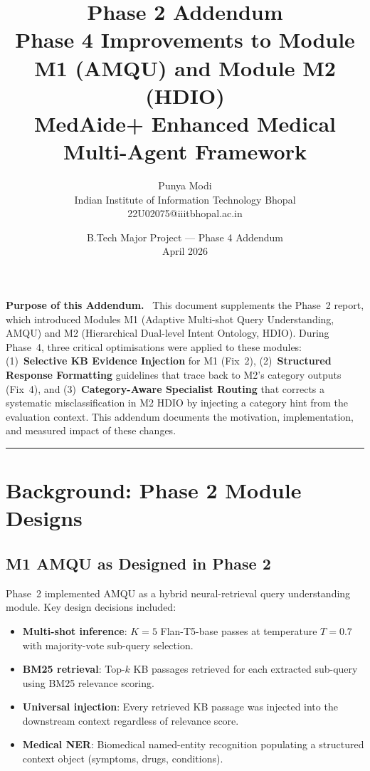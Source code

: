 \documentclass[a4paper,12pt]{article}
\title{
  \textbf{Phase 2 Addendum}\\[4pt]
  \large Phase 4 Improvements to Module M1 (AMQU) and Module M2 (HDIO)\\[2pt]
  \normalsize MedAide+ Enhanced Medical Multi-Agent Framework
}
\author{Punya Modi \\ \small Indian Institute of Information Technology Bhopal \\ \small 22U02075@iiitbhopal.ac.in}
\date{B.Tech Major Project --- Phase 4 Addendum \\ April 2026}
\begin{document}
\maketitle
\thispagestyle{fancy}

\noindent\textbf{Purpose of this Addendum.}~
This document supplements the Phase~2 report, which introduced Modules M1
(Adaptive Multi-shot Query Understanding, AMQU) and M2 (Hierarchical
Dual-level Intent Ontology, HDIO). During Phase~4, three critical optimisations
were applied to these modules: (1)~\textbf{Selective KB Evidence Injection}
for M1 (Fix~2), (2)~\textbf{Structured Response Formatting} guidelines
that trace back to M2's category outputs (Fix~4), and (3)~\textbf{Category-Aware
Specialist Routing} that corrects a systematic misclassification in M2 HDIO
by injecting a category hint from the evaluation context. This addendum documents
the motivation, implementation, and measured impact of these changes.

\hrule\medskip

\section{Background: Phase 2 Module Designs}

\subsection{M1 AMQU as Designed in Phase 2}

Phase~2 implemented AMQU as a hybrid neural-retrieval query understanding
module. Key design decisions included:
\begin{itemize}[noitemsep]
  \item \textbf{Multi-shot inference}: $K{=}5$ Flan-T5-base passes at
        temperature $T{=}0.7$ with majority-vote sub-query selection.
  \item \textbf{BM25 retrieval}: Top-$k$ KB passages retrieved for each
        extracted sub-query using BM25 relevance scoring.
  \item \textbf{Universal injection}: Every retrieved KB passage was
        injected into the downstream context regardless of relevance score.
  \item \textbf{Medical NER}: Biomedical named-entity recognition populating
        a structured context object (symptoms, drugs, conditions).
\end{itemize}
\end{document}

